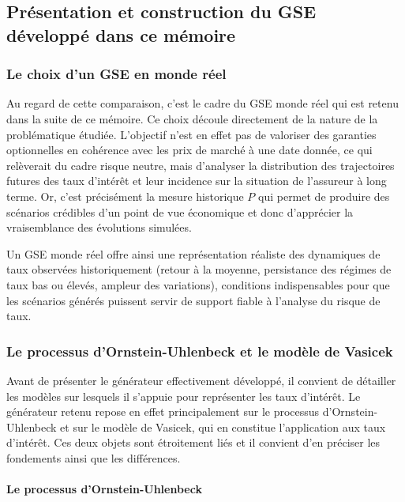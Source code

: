 \subsection{Présentation et construction du GSE développé dans ce mémoire}

\subsubsection{Le choix d'un GSE en monde réel}

Au regard de cette comparaison, c'est le cadre du GSE monde réel qui est retenu dans la suite de ce mémoire. Ce choix découle directement de la nature de la problématique étudiée. L'objectif n'est en effet pas de valoriser des garanties optionnelles en cohérence avec les prix de marché à une date donnée, ce qui relèverait du cadre risque neutre, mais d'analyser la distribution des trajectoires futures des taux d'intérêt et leur incidence sur la situation de l'assureur à long terme. Or, c'est précisément la mesure historique $P$ qui permet de produire des scénarios crédibles d'un point de vue économique et donc d'apprécier la vraisemblance des évolutions simulées.

Un GSE monde réel offre ainsi une représentation réaliste des dynamiques de taux observées historiquement (retour à la moyenne, persistance des régimes de taux bas ou élevés, ampleur des variations), conditions indispensables pour que les scénarios générés puissent servir de support fiable à l'analyse du risque de taux.

\subsubsection{Le processus d'Ornstein-Uhlenbeck et le modèle de Vasicek}

Avant de présenter le générateur effectivement développé, il convient de détailler les modèles sur lesquels il s'appuie pour représenter les taux d'intérêt. Le générateur retenu repose en effet principalement sur le processus d'Ornstein-Uhlenbeck et sur le modèle de Vasicek, qui en constitue l'application aux taux d'intérêt. Ces deux objets sont étroitement liés et il convient d'en préciser les fondements ainsi que les différences.

\paragraph{Le processus d'Ornstein-Uhlenbeck}

